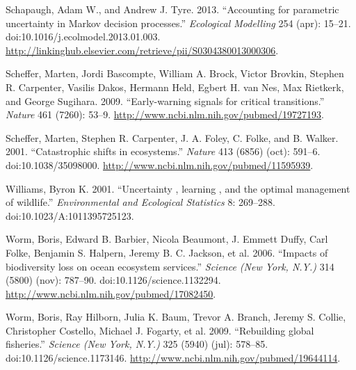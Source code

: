 \documentclass[author-year, review]{elsarticle} %
\begin{document}
Schapaugh, Adam W., and Andrew J. Tyre. 2013. ``Accounting for
parametric uncertainty in Markov decision processes.'' \emph{Ecological
Modelling} 254 (apr): 15--21. doi:10.1016/j.ecolmodel.2013.01.003.
\url{http://linkinghub.elsevier.com/retrieve/pii/S0304380013000306}.

Scheffer, Marten, Jordi Bascompte, William A. Brock, Victor Brovkin,
Stephen R. Carpenter, Vasilis Dakos, Hermann Held, Egbert H. van Nes,
Max Rietkerk, and George Sugihara. 2009. ``Early-warning signals for
critical transitions.'' \emph{Nature} 461 (7260): 53--9.
\url{http://www.ncbi.nlm.nih.gov/pubmed/19727193}.

Scheffer, Marten, Stephen R. Carpenter, J. A. Foley, C. Folke, and B.
Walker. 2001. ``Catastrophic shifts in ecosystems.'' \emph{Nature} 413
(6856) (oct): 591--6. doi:10.1038/35098000.
\url{http://www.ncbi.nlm.nih.gov/pubmed/11595939}.

Williams, Byron K. 2001. ``Uncertainty , learning , and the optimal
management of wildlife.'' \emph{Environmental and Ecological Statistics}
8: 269--288. doi:10.1023/A:1011395725123.

Worm, Boris, Edward B. Barbier, Nicola Beaumont, J. Emmett Duffy, Carl
Folke, Benjamin S. Halpern, Jeremy B. C. Jackson, et al. 2006. ``Impacts
of biodiversity loss on ocean ecosystem services.'' \emph{Science (New
York, N.Y.)} 314 (5800) (nov): 787--90. doi:10.1126/science.1132294.
\url{http://www.ncbi.nlm.nih.gov/pubmed/17082450}.

Worm, Boris, Ray Hilborn, Julia K. Baum, Trevor A. Branch, Jeremy S.
Collie, Christopher Costello, Michael J. Fogarty, et al. 2009.
``Rebuilding global fisheries.'' \emph{Science (New York, N.Y.)} 325
(5940) (jul): 578--85. doi:10.1126/science.1173146.
\url{http://www.ncbi.nlm.nih.gov/pubmed/19644114}.
\end{document}
